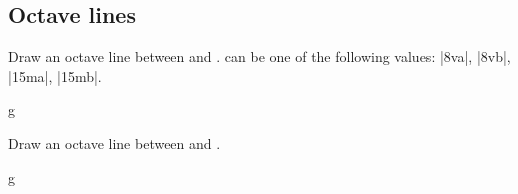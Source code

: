 \subsection{Octave lines}\label{sec:line:octave}
\begin{command}{\tmoctave{}}
  Draw an octave line between  and .  can 
  be one of the following values: |8va|, |8vb|, |15ma|, |15mb|.
\end{command}
\begin{codeexample}[]
\begin{tmline}
\begin{tmstaff}{g}{}
    
    
    
\end{tmstaff}
\end{tmline}
\end{codeexample}
\begin{command}{\tmoctavecoordinate{}}
  Draw an octave line between  and .
\end{command}
\begin{codeexample}[]
\begin{tmline}
\begin{tmstaff}{g}{}
\end{tmstaff}
\end{tmline}
\end{codeexample}
